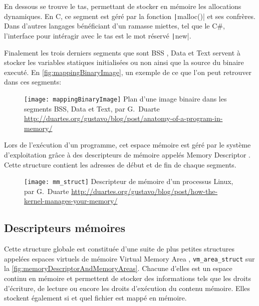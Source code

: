 En dessous se trouve le tas, permettant de stocker en mémoire les allocations dynamiques. En C, ce segment est géré par la fonction \texttt|malloc()| et ses confrères. Dans d'autres langages bénéficiant d'un ramasse miettes, tel que le C\#, l'interface pour intéragir avec le tas est le mot réservé \texttt|new|.

Finalement les trois derniers segments que sont \og BSS \fg, \og Data \fg et \og Text \fg servent à stocker les variables statiques initialisées ou non ainsi que la source du binaire executé. En \autoref{fig:mappingBinaryImage}, un exemple de ce que l'on peut retrouver dans ces segments:

\begin{figure}[H]
	\centering
	\texttt{[image: mappingBinaryImage]}
	{Plan d'une image binaire dans les segments BSS, Data et Text, par G.~Duarte}
	{\url{http://duartes.org/gustavo/blog/post/anatomy-of-a-program-in-memory/}}
	\label{fig:mappingBinaryImage}
\end{figure}

Lors de l'exécution d'un programme, cet espace mémoire est géré par le système d'exploitation grâce à des descripteurs de mémoire appelés \og Memory Descriptor \fg. Cette structure contient les adresses de début et de fin de chaque segments.

\begin{figure}[H]
	\centering
	\texttt{[image: mm\_struct]}
	{Descripteur de mémoire d'un processus Linux, par G.~Duarte}
	{\url{http://duartes.org/gustavo/blog/post/how-the-kernel-manages-your-memory/}}
	\label{fig:mm_struct}
\end{figure}

\subsection{Descripteurs mémoires}

Cette structure globale est constituée d'une suite de plus petites structures appelées espaces virtuels de mémoire \og Virtual Memory Area \fg, \texttt{vm_area_struct} sur la \autoref{fig:memoryDescriptorAndMemoryAreas}. Chacune d'elles est un espace continu en mémoire et permettent de stocker des informations tels que les droits d'écriture, de lecture ou encore les droits d'exécution du contenu mémoire. Elles stockent également si et quel fichier est mappé en mémoire.

